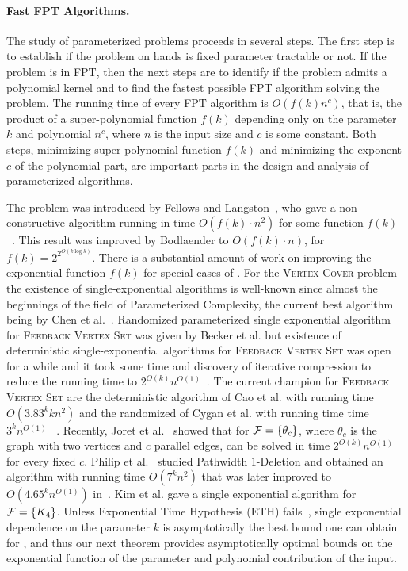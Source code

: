 \vspace{-.5cm}
\paragraph{Fast FPT Algorithms.} 
The study of parameterized problems proceeds in several steps. The first step is to establish if the  problem on hands is fixed parameter tractable or not. If the problem is in FPT, then the next steps are to identify if the problem admits a polynomial kernel and to find the fastest possible FPT algorithm solving the problem. 
The running time  of every FPT algorithm is   $O(f(k) n^c)$, that is, the product of a super-polynomial function $f(k) $ depending only on the parameter $k$ and polynomial $n^c$, where $n$ is the input size and $c$ is some constant.  Both steps, minimizing super-polynomial function $f(k)$ and minimizing  the exponent
$c$ of the polynomial part, are important parts in the design and analysis of parameterized algorithms. 

 The \fd{} problem was introduced by Fellows and Langston~\cite{FellowsL88}, who gave a
non-constructive algorithm running in time $O(f(k)\cdot n^{2})$ for some function
$f(k)$~\cite[Theorem $6$]{FellowsL88}.  This result was improved by Bodlaender
\cite{Bodlaender97} to  $O(f(k)\cdot n)$,  for  $f(k)=2^{2^{O(k \log k)}}$. 
There is a substantial amount of  work  on  improving the exponential function $f(k)$ for special cases of  \fd{}.
For the \textsc{Vertex Cover} problem
the existence of single-exponential algorithms is well-known
since almost the beginnings of the field of Parameterized
Complexity, the current best algorithm being by
Chen et al.~\cite{ChenKX10}. Randomized parameterized single exponential algorithm for 
\textsc{Feedback Vertex Set} was given by Becker et al.
\cite{BeckerBRG00-Ra} but 
   existence of deterministic single-exponential algorithms for
\textsc{Feedback Vertex Set} was open for a while and it took some time and 
discovery of iterative compression  \cite{ReedSmithVetta04}
 to reduce the running time to  $2^{O(k)}n^{O(1)}$~\cite{CaoCL10,ChenFLLV08,CNP+11,DehneFLRS07,GuoGHNW06,RamanSS06}.  The current  champion for
\textsc{Feedback Vertex Set} are the deterministic algorithm of 
Cao et al.  \cite{CaoCL10} with running time $O(3.83^k k n^2)$ and the randomized of Cygan et al.
with running time time~$3^kn^{O(1)}$ ~\cite{CNP+11}. Recently, Joret et al.~\cite{JoretPSST11} showed 
that  \fd{} for ${\cal F}
=\{ \theta_c\}$, where  $\theta_c$ is the graph with two vertices and $c$ parallel edges,     can be solved in time $2^{O(k)}n^{O(1)}$ for 
every fixed $c$. Philip et al.~\cite{PhilipRV10} studied {\sc Pathwidth $1$-Deletion} 
and obtained an algorithm with running time $O(7^kn^{2})$ that was later improved to $O(4.65^k n^{O(1)})$ in~\cite{CyganPPW10}.
Kim et al. \cite{KimPG12} gave a single exponential algorithm for  ${\cal F}
=\{ K_4\}$.  Unless Exponential Time Hypothesis (ETH) fails~\cite{CCF+05,ImpagliazzoPZ01}, single exponential dependence on the parameter $k$ is asymptotically the best bound one can obtain for \fd{}, and thus our next theorem provides asymptotically  optimal bounds on the exponential function of the parameter   and polynomial contribution of the input. 


